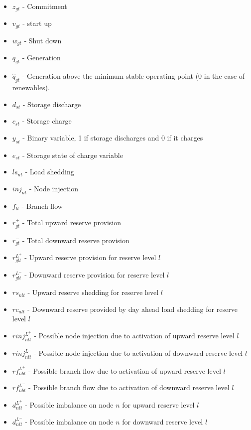 \documentclass[number,times]{elsarticle}
\begin{document}
\begin{itemize}
    \item $z_{gt}$ - Commitment
    \item $v_{gt}$ - start up
    \item $w_{gt}$ - Shut down
    \item $q_{gt}$ - Generation
    \item $\hat{q}_{gt}$ - Generation above the minimum stable operating point (0 in the case of renewables).
    \item $d_{st}$ - Storage discharge
    \item $c_{st}$ - Storage charge
    \item $y_{st}$ - Binary variable, 1 if storage discharges and 0 if it charges
    \item $e_{st}$ - Storage state of charge variable
    \item $ls_{nt}$ - Load shedding
    \item $inj_{nt}$ - Node injection
    \item $f_{lt}$ - Branch flow
    \item $r^+_{gt}$ - Total upward reserve provision
    \item $r^-_{gt}$ - Total downward reserve provision
    \item $r^{L^+}_{glt}$ - Upward reserve provision for reserve level $l$
    \item $r^{L^-}_{glt}$ - Downward reserve provision for reserve level $l$
    \item $rs_{nlt}$ - Upward reserve shedding for reserve level $l$
    \item $rc_{nlt}$ - Downward reserve provided by day ahead load shedding for reserve level $l$
    \item $rinj_{nlt}^{L^+}$ - Possible node injection due to activation of upward reserve level $l$
    \item $rinj_{nlt}^{L^-}$ - Possible node injection due to activation of downward reserve level $l$
    \item $rf_{nbt}^{L^+}$ - Possible branch flow due to activation of upward reserve level $l$
    \item $rf_{nbt}^{L^-}$ - Possible branch flow due to activation of downward reserve level $l$
    \item $d_{nlt}^{L^+}$ - Possible imbalance on node $n$ for upward reserve level $l$
    \item $d_{nlt}^{L^-}$ - Possible imbalance on node $n$ for downward reserve level $l$
\end{itemize}
\end{document}
